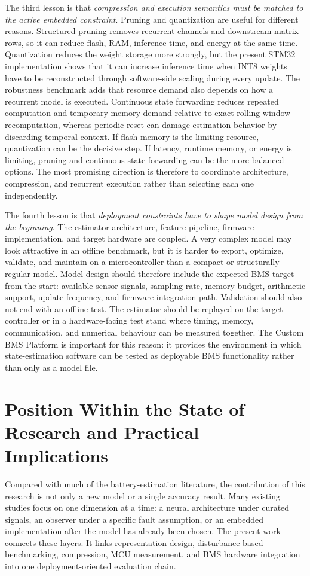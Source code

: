 \documentclass[
    a4paper,
    12pt,
    titlepage,
    bibliography=totoc,
    twoside=on,
    parskip=false,
    numbers=noenddot,
    cleardoublepage=empty,
    DIV=12,
    BCOR=12.0mm,
    headheight=36pt,
    headings=openright
]{scrreprt}
\begin{document}
The third lesson is that \emph{compression and execution semantics must be matched to the active embedded constraint}. Pruning and quantization are useful for different reasons. Structured pruning removes recurrent channels and downstream matrix rows, so it can reduce flash, RAM, inference time, and energy at the same time. Quantization reduces the weight storage more strongly, but the present STM32 implementation shows that it can increase inference time when INT8 weights have to be reconstructed through software-side scaling during every update. The robustness benchmark adds that resource demand also depends on how a recurrent model is executed. Continuous state forwarding reduces repeated computation and temporary memory demand relative to exact rolling-window recomputation, whereas periodic reset can damage estimation behavior by discarding temporal context. If flash memory is the limiting resource, quantization can be the decisive step. If latency, runtime memory, or energy is limiting, pruning and continuous state forwarding can be the more balanced options. The most promising direction is therefore to coordinate architecture, compression, and recurrent execution rather than selecting each one independently.

The fourth lesson is that \emph{deployment constraints have to shape model design from the beginning}. The estimator architecture, feature pipeline, firmware implementation, and target hardware are coupled. A very complex model may look attractive in an offline benchmark, but it is harder to export, optimize, validate, and maintain on a microcontroller than a compact or structurally regular model. Model design should therefore include the expected BMS target from the start: available sensor signals, sampling rate, memory budget, arithmetic support, update frequency, and firmware integration path. Validation should also not end with an offline test. The estimator should be replayed on the target controller or in a hardware-facing test stand where timing, memory, communication, and numerical behaviour can be measured together. The Custom BMS Platform is important for this reason: it provides the environment in which state-estimation software can be tested as deployable BMS functionality rather than only as a model file.

\section{Position Within the State of Research and Practical Implications}
Compared with much of the battery-estimation literature, the contribution of this research is not only a new model or a single accuracy result. Many existing studies focus on one dimension at a time: a neural architecture under curated signals, an observer under a specific fault assumption, or an embedded implementation after the model has already been chosen. The present work connects these layers. It links representation design, disturbance-based benchmarking, compression, MCU measurement, and BMS hardware integration into one deployment-oriented evaluation chain.
\end{document}
